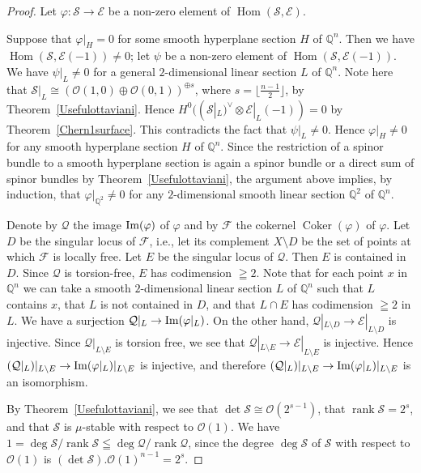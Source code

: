 \documentclass[a4paper,12pt]{amsart}
\newcommand{\im}{\mathop{\rm Im}\nolimits}
\DeclareMathOperator{\Hom}{Hom}
\DeclareMathOperator{\Coker}{Coker}
\DeclareMathOperator{\rk}{rank}
\begin{document}
\begin{proof}
Let $\varphi:\mathcal{S}\to\mathcal{E}$ be a non-zero element of $\Hom (\mathcal{S},\mathcal{E})$.

Suppose that 
$\varphi|_{H}=0$ for some smooth hyperplane section $H$ of $\mathbb{Q}^n$.
Then we have 
$\Hom (\mathcal{S},\mathcal{E}(-1))\neq 0$;
let $\psi$ be a non-zero element of $\Hom (\mathcal{S},\mathcal{E}(-1))$.
We have $\psi|_{L}\neq 0$ for a general $2$-dimensional linear section $L$ of $\mathbb{Q}^n$.
Note
here that $\mathcal{S}|_L\cong (\mathcal{O}(1,0)\oplus \mathcal{O}(0,1))^{\oplus s}$,
where $s=\lfloor \frac{n-1}{2}\rfloor$,
by Theorem~\ref{Usefulottaviani}.
Hence $H^0((\mathcal{S}|_L)^{\vee}\otimes \mathcal{E}|_L(-1))=0$ by Theorem~\ref{Chern1surface}.
This contradicts the fact that $\psi|_L\neq 0$. 
Hence 
$\varphi|_{H}\neq 0$ for any smooth hyperplane 
section $H$ of $\mathbb{Q}^n$.
Since 
the restriction of a spinor bundle to a smooth hyperplane section
is again a spinor bundle or a direct sum of spinor bundles
by Theorem~\ref{Usefulottaviani},
the argument above implies, by induction,
that $\varphi|_{\mathbb{Q}^2}\neq 0$ for any $2$-dimensional smooth linear section
$\mathbb{Q}^2$ of $\mathbb{Q}^n$.

Denote by $\mathcal{Q}$ the image $\im (\varphi)$ of $\varphi$
and by $\mathcal{F}$ the cokernel $\Coker(\varphi)$ of $\varphi$.
Let $D$ be the singular locus of $\mathcal{F}$,
i.e., let its complement $X\setminus D$ be the set of points at which $\mathcal{F}$ is locally free.
Let $E$ be the singular locus of $\mathcal{Q}$.
Then $E$ is contained in $D$.
Since $\mathcal{Q}$ is torsion-free, $E$ has codimension $\geqq 2$.
Note that for each point $x$ in $\mathbb{Q}^n$ we can take a smooth $2$-dimensional linear section $L$
of $\mathbb{Q}^n$ such that $L$ contains $x$, that $L$ is not contained in $D$,
and that $L\cap E$ has codimension $\geqq 2$ in $L$.
We have a surjection $\mathcal{Q}|_L\to \im (\varphi|_L)$.
On the other hand, $\mathcal{Q}|_{L\setminus D}\to \mathcal{E}|_{L\setminus D}$ is injective.
Since $\mathcal{Q}|_{L\setminus E}$ is torsion free, 
we see that $\mathcal{Q}|_{L\setminus E}\to \mathcal{E}|_{L\setminus E}$ is injective.
Hence $(\mathcal{Q}|_L)|_{L\setminus E}\to \im (\varphi|_L)|_{L\setminus E}$ is injective,
and therefore 
$(\mathcal{Q}|_L)|_{L\setminus E}\to \im (\varphi|_L)|_{L\setminus E}$ 
is an isomorphism.

By Theorem~\ref{Usefulottaviani}, 
we see 
that 
$\det\mathcal{S}\cong \mathcal{O}(2^{s-1})$, that $\rk \mathcal{S}=2^s$,
and that $\mathcal{S}$ is $\mu$-stable
with respect to $\mathcal{O}(1)$.
We have $
1=\deg\mathcal{S}/\rk\mathcal{S}
\leqq 
\deg\mathcal{Q}/\rk\mathcal{Q}$,
since the degree $\deg \mathcal{S}$ of $\mathcal{S}$ with respect to $\mathcal{O}(1)$
is $(\det\mathcal{S}).\mathcal{O}(1)^{n-1}=2^s$.



\end{proof}
\end{document}
